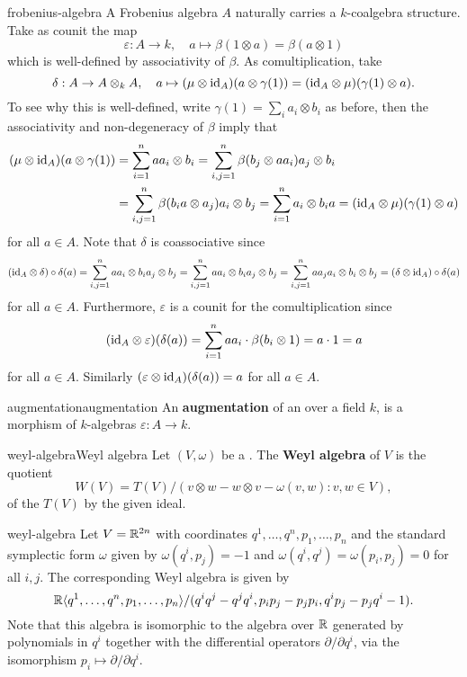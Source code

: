 \begin{example}{frobenius-algebra}
    A Frobenius algebra $A$ naturally carries a $k$-coalgebra structure. Take as counit the map
    \[ \varepsilon : A \to k, \quad a \mapsto \beta(1 \otimes a) = \beta(a \otimes 1) \]
    which is well-defined by associativity of $\beta$. As comultiplication, take
    \[ \delta : A \to A \otimes_k A, \quad a \mapsto (\mu \otimes \textup{id}_A)(a \otimes \gamma(1)) = (\textup{id}_A \otimes \mu)(\gamma(1) \otimes a) . \]
    To see why this is well-defined, write $\gamma(1) = \sum_i a_i \otimes b_i$ as before, then the associativity and non-degeneracy of $\beta$ imply that
    \[ \begin{aligned}
        (\mu \otimes \textup{id}_A)(a \otimes \gamma(1)) &= \sum_{i = 1}^{n} a a_i \otimes b_i = \sum_{i,j = 1}^{n} \beta(b_j \otimes a a_i) a_j \otimes b_i \\ &= \sum_{i,j = 1}^{n} \beta(b_i a \otimes a_j) a_i \otimes b_j = \sum_{i = 1}^{n} a_i \otimes b_i a = (\textup{id}_A \otimes \mu)(\gamma(1) \otimes a) 
    \end{aligned} \]
    for all $a \in A$. Note that $\delta$ is coassociative since
    \[ (\textup{id}_A \otimes \delta) \circ \delta(a) = \sum_{i, j = 1}^{n} a a_i \otimes b_i a_j \otimes b_j = \sum_{i, j = 1}^{n} a a_i \otimes b_i a_j \otimes b_j = \sum_{i, j = 1}^{n} a a_j a_i \otimes b_i \otimes b_j = (\delta \otimes \textup{id}_A) \circ \delta(a) \]
    for all $a \in A$. Furthermore, $\varepsilon$ is a counit for the comultiplication since
    \[ (\textup{id}_A \otimes \varepsilon)(\delta(a)) = \sum_{i = 1}^{n} a a_i \cdot \beta(b_i \otimes 1) = a \cdot 1 = a \]
    for all $a \in A$. Similarly $(\varepsilon \otimes \textup{id}_A)(\delta(a)) = a$ for all $a \in A$.
\end{example}

\begin{topic}{augmentation}{augmentation}
    An \textbf{augmentation} of an  over a field $k$, is a morphism of $k$-algebras $\varepsilon : A \to k$.
\end{topic}

\begin{topic}{weyl-algebra}{Weyl algebra}
    Let $(V, \omega)$ be a . The \textbf{Weyl algebra} of $V$ is the quotient
    \[ W(V) = T(V) / (v \otimes w - w \otimes v - \omega(v, w) : v, w \in V) , \]
    of the  $T(V)$ by the given ideal.
\end{topic}

\begin{example}{weyl-algebra}
    Let $V = \mathbb{R}^{2n}$ with coordinates $q^1, \ldots, q^n, p_1, \ldots, p_n$ and the standard symplectic form $\omega$ given by $\omega(q^i, p_j) = -1$ and $\omega(q^i, q^j) = \omega(p_i, p_j) = 0$ for all $i, j$. The corresponding Weyl algebra is given by
    \[ \mathbb{R} \langle q^1, \ldots, q^n, p_1, \ldots, p_n \rangle / (q^i q^j - q^j q^i, p_i p_j - p_j p_i, q^i p_j - p_j q^i - 1) . \]
    Note that this algebra is isomorphic to the algebra over $\mathbb{R}$ generated by polynomials in $q^i$ together with the differential operators $\partial/\partial q^i$, via the isomorphism $p_i \mapsto \partial/\partial q^i$.
\end{example}

